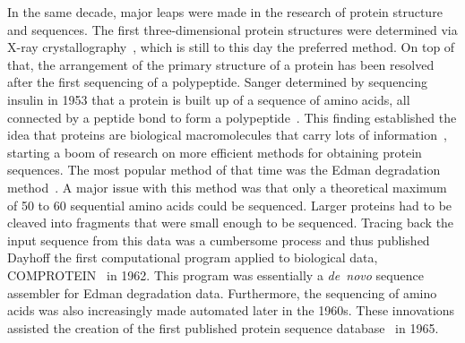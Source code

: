 In the same decade, major leaps were made in the research of protein structure and sequences. The first three-dimensional protein structures were determined via X-ray crystallography~\cite{xray}, which is still to this day the preferred method. On top of that, the arrangement of the primary structure of a protein has been resolved after the first sequencing of a polypeptide. Sanger determined by sequencing insulin in 1953 that a protein is built up of a sequence of amino acids, all connected by a peptide bond to form a polypeptide~\cite{insulin}. This finding established the idea that proteins are biological macromolecules that carry lots of information~\cite{primstruct}, starting a boom of research on more efficient methods for obtaining protein sequences. The most popular method of that time was the Edman degradation method~\cite{edman}. A major issue with this method was that only a theoretical maximum of 50 to 60 sequential amino acids could be sequenced. Larger proteins had to be cleaved into fragments that were small enough to be sequenced. Tracing back the input sequence from this data was a cumbersome process and thus published Dayhoff the first computational program applied to biological data, COMPROTEIN~\cite{comprotein} in 1962. This program was essentially a \mbox{\textit{de novo}} sequence assembler for Edman degradation data. Furthermore, the sequencing of amino acids was also increasingly made automated later in the 1960s. These innovations assisted the creation of the first published protein sequence database~\cite{atlas} in 1965. 

